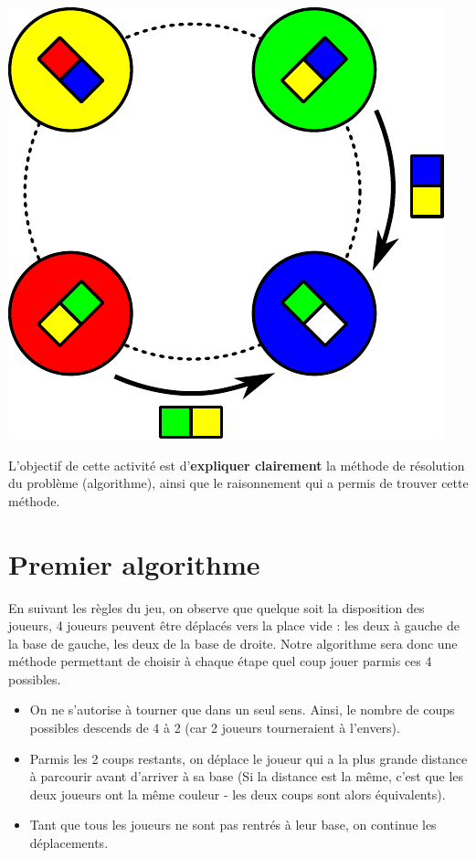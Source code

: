 \documentclass[a5paper,pagesize,DIV=14]{scrbook}
\begin{document}
\begin{center}
  \includegraphics[width=0.3\linewidth]{img/baseball_coup.pdf}
\end{center}


L'objectif de cette activité est d'\textbf{expliquer clairement} la méthode de résolution du problème (algorithme), ainsi que le raisonnement qui a permis de trouver cette méthode.

\newpage

\section*{Premier algorithme}

En suivant les règles du jeu, on observe que quelque soit la disposition des joueurs, 4 joueurs peuvent être déplacés vers la place vide : les deux à gauche de la base de gauche, les deux de la base de droite. Notre algorithme sera donc une méthode permettant de choisir à chaque étape quel coup jouer parmis ces 4 possibles.

\begin{itemize}
  \item On ne s'autorise à tourner que dans un seul sens. Ainsi, le nombre de coups possibles descends de 4 à 2 (car 2 joueurs tourneraient à l'envers).
  \item Parmis les 2 coups restants, on déplace le joueur qui a la plus grande distance à parcourir avant d'arriver à sa base (Si la distance est la même, c'est que les deux joueurs ont la même couleur - les deux coups sont alors équivalents).
  \item Tant que tous les joueurs ne sont pas rentrés à leur base, on continue les déplacements.
\end{itemize}
\end{document}
